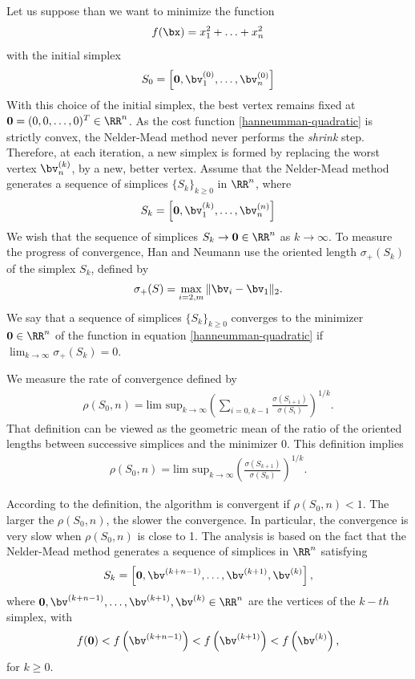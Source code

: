 Let us suppose than we want to minimize the function 
\begin{eqnarray}
\label{hanneumman-quadratic}
f(\bx) = x_1^2+\ldots+x_n^2
\end{eqnarray}
with the initial simplex 
\begin{eqnarray}
S_0 = \left[\bold{0},\bv^{(0)}_1,\ldots,\bv^{(0)}_n\right]
\end{eqnarray}
With this choice of the initial simplex, the best vertex remains fixed 
at $\bold{0}=(0,0,\ldots,0)^T\in\RR^n$. As the cost function \ref{hanneumman-quadratic}
is strictly convex, the Nelder-Mead method never performs
the \emph{shrink} step. Therefore, at each iteration, a new simplex 
is formed by replacing the worst vertex $\bv^{(k)}_n$, by a 
new, better vertex. Assume that the Nelder-Mead method 
generates a sequence of simplices $\{S_k\}_{k\geq 0}$ in $\RR^n$,
where 
\begin{eqnarray}
S_k = \left[\bold{0},\bv^{(k)}_1,\ldots,\bv^{(n)}_n\right]
\end{eqnarray}
We wish that the sequence of simplices $S_k\rightarrow \bold{0}\in\RR^n$
as $k\rightarrow \infty$. To measure the progress of convergence,
Han and Neumann use the oriented length $\sigma_+(S_k)$ of the simplex $S_k$,
defined by 
\begin{eqnarray}
\sigma_+(S) = \max_{i=2,m} \|\bv_i - \bv_1\|_2.
\end{eqnarray}
We say that a sequence of simplices $\{S_k\}_{k\geq 0}$ converges to the minimizer $\bold{0}\in\RR^n$
of the function in equation \ref{hanneumman-quadratic} if 
$\lim_{k\rightarrow \infty} \sigma_+(S_k) = 0$.

We measure the rate of convergence defined by 
\begin{eqnarray}
\label{rho-rate-convergence}
\rho(S_0,n) = \textrm{lim sup}_{k\rightarrow \infty} 
\left(\sum_{i=0,k-1} \frac{\sigma(S_{i+1})}{\sigma(S_i)}\right)^{1/k}.
\end{eqnarray}
That definition can be viewed as the geometric mean of the ratio of the 
oriented lengths between successive simplices and the minimizer 0.
This definition implies 
\begin{eqnarray}
\label{rho-rate-convergence2}
\rho(S_0,n) = \textrm{lim sup}_{k\rightarrow \infty} 
\left( \frac{\sigma(S_{k+1})}{\sigma(S_0)}\right)^{1/k}.
\end{eqnarray}

According to the definition, the algorithm is convergent if $\rho(S_0,n) < 1$.
The larger the $\rho(S_0,n)$, the slower the convergence. In particular, the convergence 
is very slow when $\rho(S_0,n)$ is close to 1. 
The analysis is based on the fact that the Nelder-Mead method generates a sequence of simplices
in $\RR^n$ satisfying 
\begin{eqnarray}
S_k = \left[\bold{0},\bv^{(k+n-1)},\ldots,\bv^{(k+1)},\bv^{(k)}\right],
\end{eqnarray}
where $\bold{0},\bv^{(k+n-1)},\ldots,\bv^{(k+1)},\bv^{(k)}\in\RR^n$ are the vertices
of the $k-th$ simplex, with
\begin{eqnarray}
f(\bold{0}) < f\left(\bv^{(k+n-1)}\right) < f\left(\bv^{(k+1)}\right) < f\left(\bv^{(k)}\right),
\end{eqnarray}
for $k\geq 0$. 

